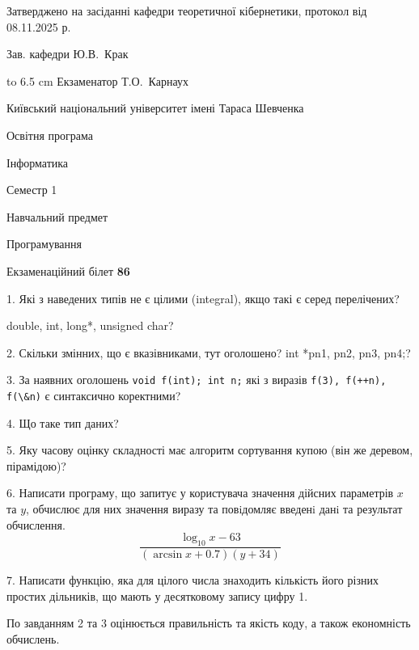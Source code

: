 \documentclass[12pt, ukrainian]{article}
\def\code#1{\Verb!#1!}
\begin{document}
{\smallskip\smallskip \begin {scriptsize} Затверджено на засіданні кафедри теоретичної кібернетики, протокол   від   08.11.2025 р.\par\smallskip\smallskip\smallskip\smallskip
{\parbox {6.5 cm} {Зав. кафедри \dotfill Ю.В.~Крак}}\hspace {0.7cm} {\hbox to 6.5 cm { Екзаменатор \dotfill Т.О.~Карнаух}} \end{scriptsize}}
\vspace{0.9cm}
{{\begin {scriptsize}\par
{ \center  Київський національний університет імені Тараса Шевченка \par}
{\parbox {5 cm}{Освітня програма \hfill}{\parbox {7 cm}{Інформатика\hfill}}\parbox {6 cm}{\hfill Семестр 1}}\par
{\parbox {5 cm} {Навчальний предмет \hfill}\parbox {7 cm}{Програмування \hfill}\parbox {6cm}{\hfill}\par}\vspace{-15pt} \end{scriptsize}}{\center Екзаменаційний білет \No \textbf { 86 }\par}}
{%
1. Які з наведених типів не є цілими (integral), якщо такі є серед перелічених?

double, int, long*, unsigned char?
\par
\vspace{2mm}
2. Скільки змінних, що є вказівниками, тут оголошено?
int *pn1, pn2, pn3, pn4;?
\par
\vspace{2mm}
3. За наявних оголошень \code{void f(int); int n;} які з виразів \code{f(3), f(++n), f(\&n)} є синтаксично коректними?
\par
\vspace{2mm}
4. Що таке тип даних?
\par
\vspace{2mm}
5. Яку часову оцінку складності має алгоритм сортування купою (він же деревом, пірамідою)?
\par
\vspace{2mm}
6. Написати програму, що запитує у користувача значення дійсних параметрів $x$ та $y$, обчислює для них значення виразу та повiдомляє введенi данi та результат обчислення.
$$\frac{\log_{10} x - 63}{(\arcsin x + 0.7) (y + 34)}$$ 

\par
7. Написати функцію, яка для цілого числа знаходить кількість його різних простих дільників, що мають у десятковому запису цифру 1.

По завданням 2 та 3 оцінюється правильність та якість коду, а також економність обчислень.

}
\end{document}
